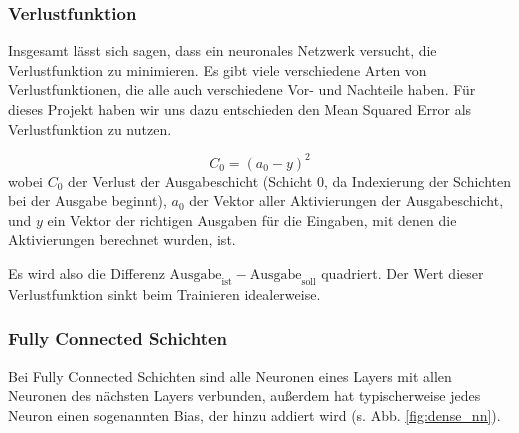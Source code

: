 \documentclass[10pt]{article}
\newcommand{\form}[1]{#1} %
\begin{document}
\subsubsection{Verlustfunktion}

Insgesamt lässt sich sagen, dass ein neuronales Netzwerk versucht, die Verlustfunktion zu minimieren.
Es gibt viele verschiedene Arten von Verlustfunktionen, die alle auch verschiedene Vor- und Nachteile haben.
Für dieses Projekt haben wir uns dazu entschieden den Mean Squared Error als Verlustfunktion zu nutzen.

\form{ \[
	C_0 = (a_0 - y)^2
\]}
\noindent wobei $C_0$ der Verlust der Ausgabeschicht (Schicht $0$, da Indexierung der Schichten bei der Ausgabe beginnt), $a_0$ der Vektor aller Aktivierungen der Ausgabeschicht, und $y$ ein Vektor der richtigen Ausgaben für die Eingaben, mit denen die Aktivierungen berechnet wurden, ist.

Es wird also die Differenz $\textrm{Ausgabe}_\textrm{ist} - \textrm{Ausgabe}_\textrm{soll}$ quadriert.
Der Wert dieser Verlustfunktion sinkt beim Trainieren idealerweise.

\subsubsection{Fully Connected Schichten} 

Bei Fully Connected Schichten sind alle Neuronen eines Layers mit allen Neuronen des nächsten Layers verbunden, außerdem hat typischerweise jedes Neuron einen sogenannten Bias, der hinzu addiert wird (s. Abb. \ref{fig:dense_nn}).
\end{document}
